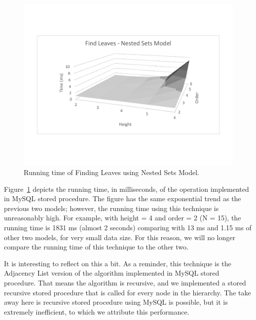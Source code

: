 \begin{figure}[!h]
\begin{center}
\includegraphics[width=6in]{images/eval/leaves/ns_surface.pdf}
\caption{Running time of Finding Leaves using Nested Sets Model.\label{fig-leaves-ns}}
\end{center}
\end{figure}

Figure~\ref{fig-leaves-ns} depicts the running time, in milliseconds, of the operation implemented in MySQL stored procedure. The figure has the same exponential trend as the previous two models; however, the running time using this technique is unreasonably high. For example, with height = 4 and order = 2 (N = 15), the running time is 1831 ms (almost 2 seconds) comparing with 13 ms and 1.15 ms of other two models, for very small data size. For this reason, we will no longer compare the running time of this technique to the other two.

It is interesting to reflect on this a bit. As a reminder, this technique is the Adjacency List version of the algorithm implemented in MySQL stored procedure. That means the algorithm is recursive, and we implemented a stored recursive stored procedure that is called for every node in the hierarchy. The take away here is recursive stored procedure using MySQL is possible, but it is extremely inefficient, to which we attribute this performance.

